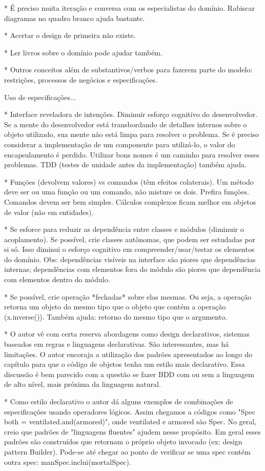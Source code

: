 \documentclass[a4paper, 12pt]{article}
\begin{document}
* É preciso muita iteração e conversa com os especialistas do domínio. Rabiscar diagramas no quadro branco ajuda bastante. 

* Acertar o design de primeira não existe.

* Ler livros sobre o domínio pode ajudar também.

* Outros conceitos além de substantivos/verbos para fazerem parte do modelo: restrições, processos de negócios e especificações.

Uso de especificações...

* Interface reveladora de intenções. Diminuir esforço cognitivo do desenvolvedor. Se a mente do desenvolvedor está transbordando de detalhes internos sobre o objeto utilizado, sua mente não está limpa para resolver o problema. Se é preciso considerar a implementação de um componente para utilizá-lo, o valor do encapsulamento é perdido. Utilizar bons nomes é um caminho para resolver esses problemas. TDD (testes de unidade antes da implementação) também ajuda.

* Funções (devolvem valores) vs comandos (têm efeitos colaterais). Um método deve ser ou uma função ou um comando, não misture os dois. Prefira funções. Comandos devem ser bem simples. Cálculos complexos ficam melhor em objetos de valor (não em entidades).

* Se esforce para reduzir as dependência entre classes e módulos (diminuir o acoplamento). Se possível, crie classes autônomas, que podem ser estudadas por si só. Isso diminui o esforço cognitivo em compreender/usar/testar os elementos do domínio. Obs: dependências visíveis na interface são piores que dependências internas; dependências com elementos fora do módulo são piores que dependência com elementos dentro do módulo.

* Se possível, crie operação *fechadas* sobre elas mesmas. Ou seja, a operação retorna um objeto do mesmo tipo que o objeto que contém a operação (x.inverse()). Também ajuda: retorno do mesmo tipo que o argumento.

* O autor vê com certa reserva abordagens como design declarativos, sistemas baseados em regras e linguagens declarativas. São interessantes, mas há limitações. O autor encoraja a utilização dos padrões apresentados ao longo do capítulo para que o código de objetos tenha um estilo mais declarativo. Essa discussão é bem parecido com a questão se fazer BDD com ou sem a linguagem de alto nível, mais próxima da linguagem natural.

* Como estilo declarativo o autor dá alguns exemplos de combinações de especificações usando operadores lógicos. Assim chegamos a códigos como "Spec both = ventilated.and(armored)", onde ventilated e armored são Spec. No geral, creio que padrões de "linguagens fluentes" ajudem nesse propósito. Em geral esses padrões são construídos que retornam o próprio objeto invocado (ex: design pattern Builder). Pode-se até chegar ao ponto de verificar se uma spec contém outra spec: manSpec.inclui(mortalSpec).
\end{document}
